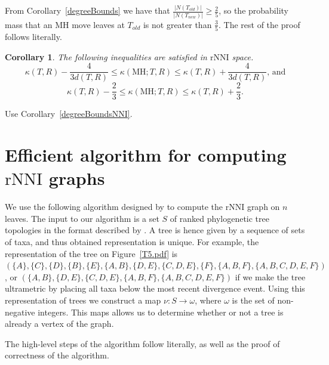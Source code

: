 \documentclass{amsart}
\newtheorem{corollary}[lemma]{Corollary}
\newcommand{\rnni}{\mathrm{rNNI}}
\newcommand{\MH}{\mathrm{MH}}
\begin{document}
\proof
From Corollary~\ref{degreeBounds} we have that $\frac{|N(T_{old})|}{|N(T_{new})|} \geq \frac{2}{5}$, so the probability mass that an MH move leaves at $T_{old}$ is not greater than $\frac35$.
The rest of the proof follows \autocite[][Proof of Lemma~V.8]{Whidden2015-es} literally.
\endproof

\begin{corollary}
The following inequalities are satisfied in $\rnni$  space.
\[
\kappa(T,R) - \dfrac{4}{3d(T,R)} \leq \kappa(\MH;T,R) \leq \kappa(T,R) +
\dfrac{4}{3d(T,R)}\mbox{, and}
\]
\[
\kappa(T,R) - \dfrac23 \leq \kappa(\MH;T,R) \leq \kappa(T,R) + \dfrac23.
\]
\end{corollary}

\proof
Use Corollary~\ref{degreeBoundsNNI}.
\endproof


\section{Efficient algorithm for computing $\rnni$ graphs}

We use the following algorithm designed by \textcite{Whidden2015-es} to compute the $\rnni$ graph on $n$ leaves.
The input to our algorithm is a set $S$ of ranked phylogenetic tree topologies in the format described by \textcite{Gavryushkin2014-bw} \autocite[see also][]{Semple2003-nj}.
A tree is hence given by a sequence of sets of taxa, and thus obtained representation is unique.
For example, the representation of the tree on Figure~\ref{T5.pdf} is $(\{A\}, \{C\}, \{D\}, \{B\}, \{E\}, \{A,B\}, \{D,E\}, \{C, D, E\}, \{F\}, \{A,B,F\}, \{A,B,C,D,E,F\})$, or
$(\{A,B\}, \{D,E\}, \{C, D, E\}, \{A,B,F\}, \{A,B,C,D,E,F\})$ if we make the tree ultrametric by placing all taxa below the most recent divergence event.
Using this representation of trees we construct a map $\nu : S \to \omega$, where $\omega$ is the set of non-negative integers.
This maps allows us to determine whether or not a tree is already a vertex of the graph.

The high-level steps of the algorithm follow \textcite{Whidden2015-es} literally, as well as the proof of correctness of the algorithm.
\end{document}
